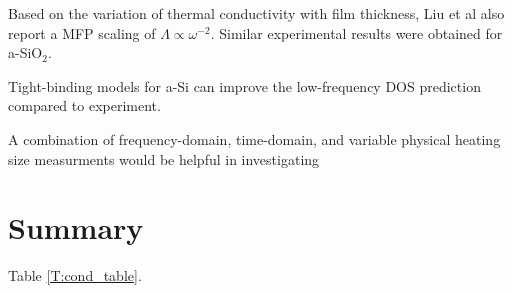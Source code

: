 \documentclass[aps,prb,twocolumn,superscriptaddress,footinbib,amsmath,amssymb,floatfix]{revtex4}
\begin{document}
Based on the variation of thermal conductivity with film thickness, 
Liu et al also report a MFP scaling of 
$\Lambda \propto \omega^{-2}$.\cite{liu_high_2009} Similar experimental 
results were obtained for a-SiO$_2$.
\cite{masciovecchio_evidence_2006}

Tight-binding models for a-Si can improve the low-frequency 
DOS prediction compared to experiment.\cite{feldman_tight-binding_2004}


A combination of frequency-domain, time-domain, and variable 
physical heating size measurments would be helpful in investigating
\cite{koh_frequency_2007,siemens_quasi-ballistic_2010,
minnich_thermal_2011,regner_broadband_2013}


\section{\label{S:Lifetimes}Summary}

Table \ref{T:cond_table}.

\end{document}
